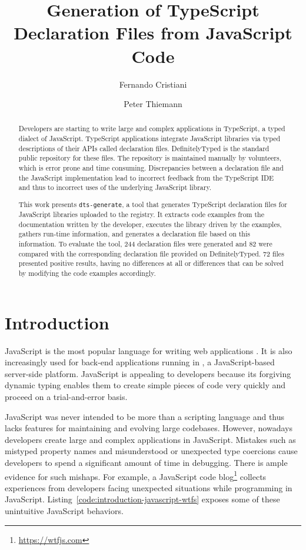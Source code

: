 \documentclass[english,cleveref,autoref,submission]{programming}
\title{Generation of TypeScript Declaration Files from JavaScript Code}
\author{Fernando Cristiani}
\affiliation{Hochschule Karlsruhe, Germany }
\author{Peter Thiemann}
\affiliation{Universität Freiburg, Germany}
\newcommand{\coderef}[1]{Listing~\ref{#1}}
\begin{document}
\maketitle

\begin{abstract}
Developers are starting to write large and complex applications in
TypeScript, a typed dialect of JavaScript. TypeScript applications
integrate JavaScript libraries via typed descriptions of their APIs
called declaration files. DefinitelyTyped is the standard public
repository for these files.
The repository is maintained manually by volunteers, which
is error prone and time consuming. Discrepancies between a
declaration file and the JavaScript implementation lead to
incorrect feedback from the TypeScript IDE and thus to incorrect uses
of the underlying JavaScript library.

This work presents \texttt{dts-generate}, a tool that generates
TypeScript declaration files for JavaScript libraries uploaded to the \NPM{}
registry. It extracts code examples from the documentation written by
the developer, executes the library driven by the examples, gathers
run-time information, and generates a declaration file based on this
information. To evaluate the tool, 244 declaration files were generated and 82 were
compared with the corresponding declaration file provided on DefinitelyTyped. 72 files presented positive results, having no differences at all or differences that can be solved by modifying the code examples accordingly.

\end{abstract}

\section{Introduction}
\label{sec:introduction}
JavaScript is the most popular language for writing web
applications \cite{github-statistics}. It is also increasingly used
for back-end applications running in \NodeJS{}, a JavaScript-based
server-side platform. JavaScript is appealing to developers because
its forgiving dynamic typing enables 
them to create simple pieces of code very quickly and proceed on a
trial-and-error basis.

JavaScript was never intended to be more than a
scripting language and thus lacks features for maintaining and evolving large
codebases. However, nowadays developers create large and complex
applications in JavaScript. 
Mistakes such as mistyped property
names and misunderstood or unexpected type coercions cause developers
to spend a significant amount of time in debugging. There is ample
evidence for such mishaps. For example, a 
JavaScript code blog\footnote{\url{https://wtfjs.com}} collects experiences
from developers facing unexpected situations while programming in
JavaScript. \coderef{code:introduction-javascript-wtfs} exposes some
of these unintuitive JavaScript behaviors. 
\end{document}
